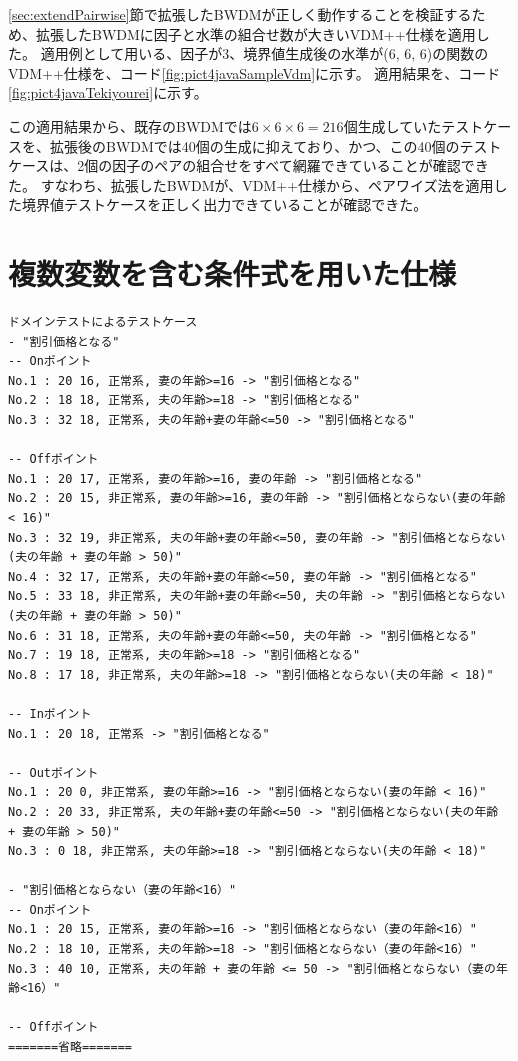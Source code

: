 \documentclass[uplatex, report, a4j, 10pt]{jsbook}
\begin{document}
\ref{sec:extendPairwise}節で拡張したBWDMが正しく動作することを検証するため、拡張したBWDMに因子と水準の組合せ数が大きいVDM++仕様を適用した。
適用例として用いる、因子が3、境界値生成後の水準が(6, 6, 6)の関数のVDM++仕様を、コード\ref{fig:pict4javaSampleVdm}に示す。
適用結果を、コード\ref{fig:pict4javaTekiyourei}に示す。

この適用結果から、既存のBWDMでは$6 \times 6 \times 6 = 216個$生成していたテストケースを、拡張後のBWDMでは40個の生成に抑えており、かつ、この40個のテストケースは、2個の因子のペアの組合せをすべて網羅できていることが確認できた。
すなわち、拡張したBWDMが、VDM++仕様から、ペアワイズ法を適用した境界値テストケースを正しく出力できていることが確認できた。


\section{複数変数を含む条件式を用いた仕様}
\lstset{language=}
\noindent\begin{minipage}{\textwidth}
  \begin{lstlisting}[caption=(遊園地チケット割引機能(コード\ref{fig:vdm_park})のテストケースの一部,label=fig:park_testcase]
ドメインテストによるテストケース
- "割引価格となる"
-- Onポイント
No.1 : 20 16, 正常系, 妻の年齢>=16 -> "割引価格となる"
No.2 : 18 18, 正常系, 夫の年齢>=18 -> "割引価格となる"
No.3 : 32 18, 正常系, 夫の年齢+妻の年齢<=50 -> "割引価格となる"

-- Offポイント
No.1 : 20 17, 正常系, 妻の年齢>=16, 妻の年齢 -> "割引価格となる"
No.2 : 20 15, 非正常系, 妻の年齢>=16, 妻の年齢 -> "割引価格とならない(妻の年齢 < 16)"
No.3 : 32 19, 非正常系, 夫の年齢+妻の年齢<=50, 妻の年齢 -> "割引価格とならない(夫の年齢 + 妻の年齢 > 50)"
No.4 : 32 17, 正常系, 夫の年齢+妻の年齢<=50, 妻の年齢 -> "割引価格となる"
No.5 : 33 18, 非正常系, 夫の年齢+妻の年齢<=50, 夫の年齢 -> "割引価格とならない(夫の年齢 + 妻の年齢 > 50)"
No.6 : 31 18, 正常系, 夫の年齢+妻の年齢<=50, 夫の年齢 -> "割引価格となる"
No.7 : 19 18, 正常系, 夫の年齢>=18 -> "割引価格となる"
No.8 : 17 18, 非正常系, 夫の年齢>=18 -> "割引価格とならない(夫の年齢 < 18)"

-- Inポイント
No.1 : 20 18, 正常系 -> "割引価格となる"

-- Outポイント
No.1 : 20 0, 非正常系, 妻の年齢>=16 -> "割引価格とならない(妻の年齢 < 16)"
No.2 : 20 33, 非正常系, 夫の年齢+妻の年齢<=50 -> "割引価格とならない(夫の年齢 + 妻の年齢 > 50)"
No.3 : 0 18, 非正常系, 夫の年齢>=18 -> "割引価格とならない(夫の年齢 < 18)"

- "割引価格とならない（妻の年齢<16）"
-- Onポイント
No.1 : 20 15, 正常系, 妻の年齢>=16 -> "割引価格とならない（妻の年齢<16）"
No.2 : 18 10, 正常系, 夫の年齢>=18 -> "割引価格とならない（妻の年齢<16）"
No.3 : 40 10, 正常系, 夫の年齢 + 妻の年齢 <= 50 -> "割引価格とならない（妻の年齢<16）"

-- Offポイント
=======省略=======
\end{lstlisting}
\end{minipage}
\end{document}

